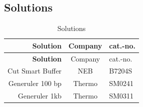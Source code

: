 \documentclass[11pt,singlespacinge,twoside]{reedthesis} %
\theoremstyle{definition}
\theoremstyle{definition}
\theoremstyle{definition}
\theoremstyle{remark}
\begin{document}
\hypertarget{mat-sol}{%
\subsection{Solutions}\label{mat-sol}}
\begin{longtable}[]{@{}rcl@{}}
\caption{\label{tab:mat-sol} Solutions}\tabularnewline
\toprule
\begin{minipage}[b]{0.29\columnwidth}\raggedleft
\textbf{Solution}\strut
\end{minipage} & \begin{minipage}[b]{0.33\columnwidth}\centering
Company\strut
\end{minipage} & \begin{minipage}[b]{0.29\columnwidth}\raggedright
cat.-no.\strut
\end{minipage}\tabularnewline
\midrule
\endfirsthead
\toprule
\begin{minipage}[b]{0.29\columnwidth}\raggedleft
\textbf{Solution}\strut
\end{minipage} & \begin{minipage}[b]{0.33\columnwidth}\centering
Company\strut
\end{minipage} & \begin{minipage}[b]{0.29\columnwidth}\raggedright
cat.-no.\strut
\end{minipage}\tabularnewline
\midrule
\endhead
\begin{minipage}[t]{0.29\columnwidth}\raggedleft
Cut Smart Buffer\strut
\end{minipage} & \begin{minipage}[t]{0.33\columnwidth}\centering
NEB\strut
\end{minipage} & \begin{minipage}[t]{0.29\columnwidth}\raggedright
B7204S\strut
\end{minipage}\tabularnewline
\begin{minipage}[t]{0.29\columnwidth}\raggedleft
Generuler 100 bp\strut
\end{minipage} & \begin{minipage}[t]{0.33\columnwidth}\centering
Thermo\strut
\end{minipage} & \begin{minipage}[t]{0.29\columnwidth}\raggedright
SM0241\strut
\end{minipage}\tabularnewline
\begin{minipage}[t]{0.29\columnwidth}\raggedleft
Generuler 1kb\strut
\end{minipage} & \begin{minipage}[t]{0.33\columnwidth}\centering
Thermo\strut
\end{minipage} & \begin{minipage}[t]{0.29\columnwidth}\raggedright
SM0311\strut
\end{minipage}\tabularnewline
\bottomrule
\end{longtable}
\end{document}
